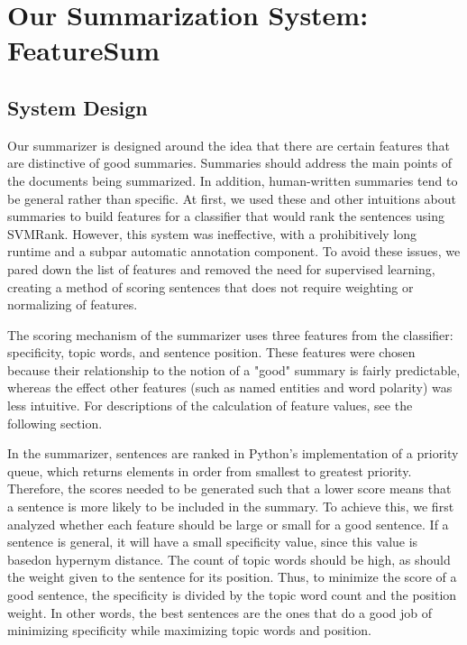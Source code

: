 \documentclass[11pt,letterpaper]{article}
\begin{document}
\section{Our Summarization System: FeatureSum}

\subsection{System Design}
Our summarizer is designed around the idea that there are certain features that are distinctive of good summaries. Summaries should address the main points of the documents being summarized. In addition, human-written summaries tend to be general rather than specific. At first, we used these and other intuitions about summaries to build features for a classifier that would rank the sentences using SVMRank. However, this system was ineffective, with a prohibitively long runtime and a subpar automatic annotation component. To avoid these issues, we pared down the list of features and removed the need for supervised learning, creating a method of scoring sentences that does not require weighting or normalizing of features. 

The scoring mechanism of the summarizer uses three features from the classifier: specificity, topic words, and sentence position. These features were chosen because their relationship to the notion of a "good" summary is fairly predictable, whereas the effect other features (such as named entities and word polarity) was less intuitive. For descriptions of the calculation of feature values, see the following section.

In the summarizer, sentences are ranked in Python's implementation of a priority queue, which returns elements in order from smallest to greatest priority. Therefore, the scores needed to be generated such that a lower score means that a sentence is more likely to be included in the summary.
To achieve this, we first analyzed whether each feature should be large or small for a good sentence. If a sentence is general, it will have a small specificity value, since this value is basedon hypernym distance. The count of topic words should be high, as should the weight given to the sentence for its position. Thus, to minimize the score of a good sentence, the specificity is divided by the topic word count and the position weight. In other words, the best sentences are the ones that do a good job of minimizing specificity while maximizing topic words and position.
\end{document}
